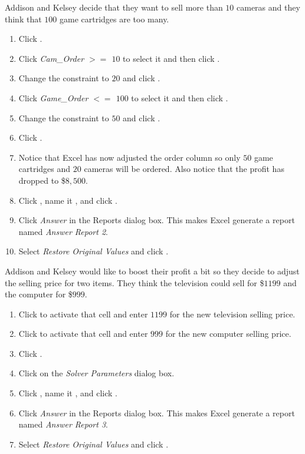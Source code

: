 Addison and Kelsey decide that they want to sell more than $ 10 $ cameras and they think that $ 100 $ game cartridges are too many. 

\begin{enumbox}
	\begin{enumerate}
		\item Click .
		\item Click \textit{Cam\_Order $ >=$ $ 10 $} to select it and then click .
		\item Change the constraint to $ 20 $ and click .
		\item Click \textit{Game\_Order $ <=$ $ 100 $} to select it and then click .
		\item Change the constraint to $ 50 $ and click .
		\item Click .
		\item Notice that Excel has now adjusted the order column so only $ 50 $ game cartridges and $ 20 $ cameras will be ordered. Also notice that the profit has dropped to \$$ 8,500 $. 
		\item Click , name it , and click .
		\item Click \textit{Answer} in the Reports dialog box. This makes Excel generate a report named \textit{Answer Report 2}.
		\item Select \textit{Restore Original Values} and click .
	\end{enumerate}
\end{enumbox}

Addison and Kelsey would like to boost their profit a bit so they decide to adjust the selling price for two items. They think the television could sell for \$$ 1199 $ and the computer for \$$ 999 $. 

\begin{enumbox}
	\begin{enumerate}
		\item Click  to activate that cell and enter $ 1199 $ for the new television selling price.
		\item Click  to activate that cell and enter $ 999 $ for the new computer selling price.
		\item Click .
		\item Click  on the \textit{Solver Parameters} dialog box.
		\item Click , name it , and click .
		\item Click \textit{Answer} in the Reports dialog box. This makes Excel generate a report named \textit{Answer Report 3}.
		\item Select \textit{Restore Original Values} and click .
	\end{enumerate}
\end{enumbox}
	
